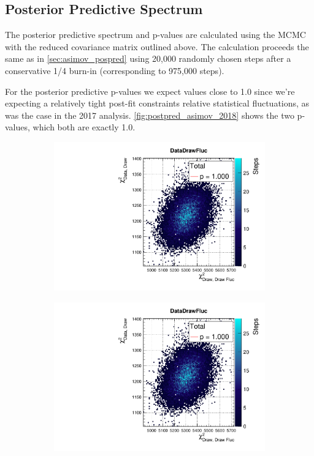 \subsection{Posterior Predictive Spectrum}
The posterior predictive \pmu \cosmu spectrum and p-values are calculated using the MCMC with the reduced covariance matrix outlined above. The calculation proceeds the same as in \autoref{sec:asimov_pospred} using 20,000 randomly chosen steps after a conservative 1/4 burn-in (corresponding to 975,000 steps). 

For the posterior predictive p-values we expect values close to 1.0 since we're expecting a relatively tight post-fit constraints relative statistical fluctuations, as was the case in the 2017 analysis. \autoref{fig:postpred_asimov_2018} shows the two p-values, which both are exactly 1.0. 
\begin{figure}[h]
	\begin{subfigure}[t]{0.49\textwidth}
		\includegraphics[width=\textwidth, trim={0mm 0mm 0mm 11mm}, clip,page=1]{figures/mach3/2018/asimov/pred/2018a_MultiPi_Binningv6_NewCov_Asimov_merge_PostPredStore_SampLLH_procs}
	\end{subfigure}
	\begin{subfigure}[t]{0.49\textwidth}
		\includegraphics[width=\textwidth, trim={0mm 0mm 0mm 11mm}, clip,page=2]{figures/mach3/2018/asimov/pred/2018a_MultiPi_Binningv6_NewCov_Asimov_merge_PostPredStore_SampLLH_procs}

\end{subfigure}
\end{figure}
